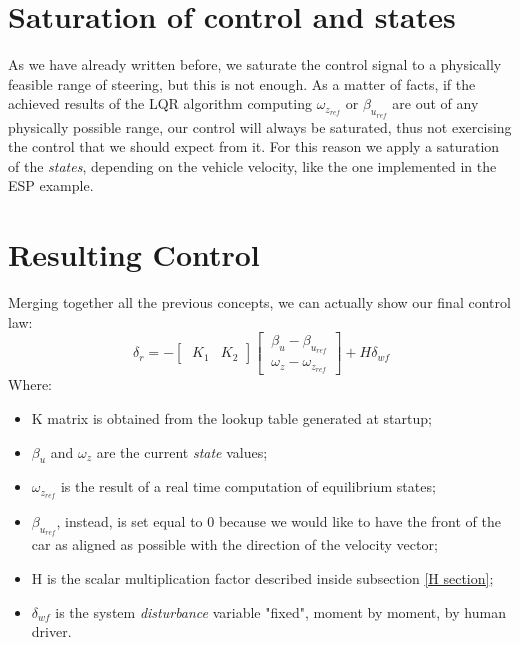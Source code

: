 \section{Saturation of control and states}
As we have already written before, we saturate the control signal to a physically feasible range of steering, but this is not enough. As a matter of facts, if the achieved results of the LQR algorithm computing $\omega_{z_{ref}}$ or $\beta_{u_{ref}}$ are out of any physically possible range, our control will always be saturated, thus not exercising the control that we should expect from it. For this reason we apply a saturation of the \textit{states}, depending on the vehicle velocity, like the one implemented in the ESP example.
\section{Resulting Control}
 Merging together all the previous concepts, we can actually show our final control law:
\begin{equation} \label{Resulting Control}
	\ \delta_{r} = -
	\begin{bmatrix}
	\ K_{1} & K_{2}
	\end{bmatrix}
	\begin{bmatrix}
	\ \beta_{u}-\beta_{u_{ref}} \\
	\ \omega_{z}-\omega_{z_{ref}}
	\end{bmatrix} + 
	H \delta_{wf}
\end{equation}
Where:
\begin{itemize}
	\item K matrix is obtained from the lookup table generated at startup;
	\item $\beta_{u}$ and $\omega_{z}$ are the current \textit{state} values;
	\item $\omega_{z_{ref}}$ is the result of a real time computation of equilibrium states;
	\item $\beta_{u_{ref}}$, instead, is set equal to 0 because we would like to have the front of the car as aligned as possible with the direction of the velocity vector;
	\item H is the scalar multiplication factor described inside subsection \ref{H section};
	\item $\delta_{wf}$ is the system \textit{disturbance} variable "fixed", moment by moment, by human driver.
\end{itemize}
